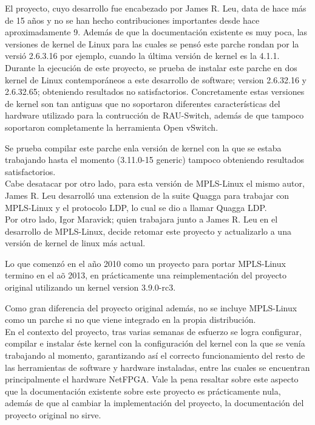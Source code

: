 El proyecto, cuyo desarrollo fue encabezado por James R. Leu, data de hace m\'as de 15 a\~nos y no se han hecho contribuciones importantes desde hace aproximadamente 9. Adem\'as de que la documentaci\'on existente es muy poca, las versiones de kernel de Linux para las cuales se pensó este parche rondan por la versi\'o 2.6.3.16 por ejemplo, cuando la \'ultima versi\'on de kernel es la 4.1.1.\\

Durante la ejecuci\'on de este proyecto, se prueba de instalar este parche en dos kernel de Linux contemporáneos a este desarrollo de software; version 2.6.32.16 y 2.6.32.65; obteniendo resultados no satisfactorios. Concretamente estas versiones de kernel son tan antiguas que no soportaron diferentes características del hardware utilizado para la contrucci\'on de RAU-Switch, adem\'as de que tampoco soportaron completamente la herramienta Open vSwitch.

Se prueba compilar este parche enla versi\'on de kernel con la que se estaba trabajando hasta el momento (3.11.0-15 generic) tampoco obteniendo resultados satisfactorios.\\

Cabe desatacar por otro lado, para esta versi\'on de MPLS-Linux el mismo autor, James R. Leu desarroll\'o una extension de la suite Quagga para trabajar con MPLS-Linux y el protocolo LDP, lo cual se dio a llamar Quagga LDP\cite{QuaggaLDP1}.\\  

Por otro lado, Igor Maravick; quien trabajara junto a James R. Leu en el desarrollo de MPLS-Linux, decide retomar este proyecto y actualizarlo a una versi\'on de kernel de linux m\'as actual. 

Lo que comenzó en el a\~no 2010 como un proyecto para portar MPLS-Linux termino en el a\~o 2013, en prácticamente una reimplementaci\'on del proyecto original utilizando un kernel version 3.9.0-rc3. 

Como gran diferencia del proyecto original adem\'as, no se incluye MPLS-Linux como un parche si no que viene integrado en la propia distribución.\\

En el contexto del proyecto, tras varias semanas de esfuerzo se logra configurar, compilar e instalar \'este kernel con la configuraci\'on del kernel con la que se ven\'ia trabajando al momento, garantizando as\'i el correcto funcionamiento del resto de las herramientas de software y hardware instaladas, entre las cuales se encuentran principalmente el hardware NetFPGA. Vale la pena resaltar sobre este aspecto que la documentaci\'on existente sobre este proyecto es prácticamente nula, adem\'as de que al cambiar la implementaci\'on del proyecto, la documentaci\'on del proyecto original no sirve.\\

